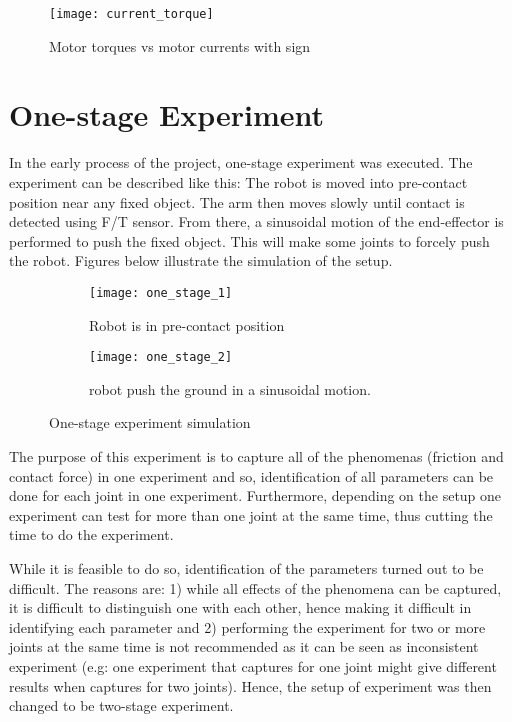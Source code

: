 \begin{figure}[H]
    \centering
    \texttt{[image: current\_torque]}
    \caption{Motor torques vs motor currents with sign}
    \label{fig:current vs torque}
\end{figure}

\section{One-stage Experiment}
In the early process of the project, one-stage experiment was executed. The experiment can be described like this: The robot is moved into pre-contact position near any fixed object. The arm then moves slowly until contact is detected using F/T sensor. From there, a sinusoidal motion of the end-effector is performed to push the fixed object. This will make some joints to forcely push the robot. Figures below illustrate the simulation of the setup.

\begin{figure}[H]
  \begin{subfigure}[t]{0.5\textwidth}
    \centering
    \texttt{[image: one\_stage\_1]} 
    \caption{Robot is in pre-contact position}
  \end{subfigure}
  \begin{subfigure}[t]{0.5\textwidth}
    \centering
    \texttt{[image: one\_stage\_2]}
    \caption{robot push the ground in a sinusoidal motion.}
  \end{subfigure}
  \caption{One-stage experiment simulation}
\end{figure}

The purpose of this experiment is to capture all of the phenomenas (friction and contact force) in one experiment and so, identification of all parameters can be done for each joint in one experiment. Furthermore, depending on the setup one experiment can test for more than one joint at the same time, thus cutting the time to do the experiment. 

While it is feasible to do so, identification of the parameters turned out to be difficult. The reasons are: 1) while all effects of the phenomena can be captured, it is difficult to distinguish one with each other, hence making it difficult in identifying each parameter and 2) performing the experiment for two or more joints at the same time is not recommended as it can be seen as inconsistent experiment (e.g: one experiment that captures for one joint might give different results when captures for two joints). Hence, the setup of experiment was then changed to be two-stage experiment.

